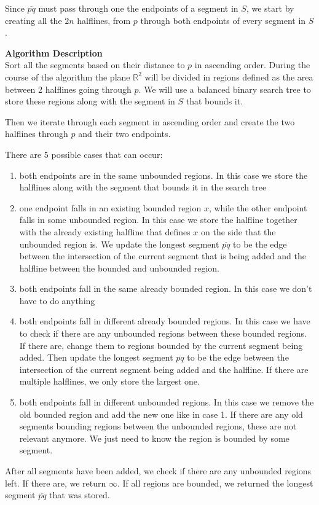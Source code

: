 \documentclass{article}
\begin{document}
\begin{enumerate}
    Since $\overline{pq}$ must pass through one the endpoints of a segment in $S$, we start by creating all the $2n$ halflines, from $p$ through both endpoints of every segment in $S$.

    \textbf{Algorithm Description} \\
    Sort all the segments based on their distance to $p$ in ascending order.
    During the course of the algorithm the plane $\mathbb{R}^2$ will be divided in regions defined as the area between 2 halflines going through $p$.
    We will use a balanced binary search tree to store these regions along with the segment in $S$ that bounds it.

    Then we iterate through each segment in ascending order and create the two halflines through $p$ and their two endpoints.

    There are 5 possible cases that can occur:
    \begin{enumerate}
      \item both endpoints are in the same unbounded regions. In this case we store the halflines along with the segment that bounds it in the search tree
      \item one endpoint falls in an existing bounded region $x$, while the other endpoint falls in some unbounded region.
       In this case we store the halfline together with the already existing halfline that defines $x$ on the side that the unbounded region is.
      We update the longest segment $\overline{pq}$ to be the edge between the intersection of the current segment that is being added and the halfline between the bounded and unbounded region.
      \item both endpoints fall in the same already bounded region. In this case we don't have to do anything
      \item both endpoints fall in different already bounded regions. In this case we have to check if there are any unbounded regions between these bounded regions.
      If there are, change them to regions bounded by the current segment being added. Then update the longest segment $\overline{pq}$ to be the edge between the intersection of the current segment being added and the halfline. 
      If there are multiple halflines, we only store the largest one.
      \item both endpoints fall in different unbounded regions. In this case we remove the old bounded region and add the new one like in case 1. 
      If there are any old segments bounding regions between the unbounded regions, these are not relevant anymore. We just need to know the region is bounded by some segment.
    \end{enumerate}
    After all segments have been added, we check if there are any unbounded regions left. If there are, we return $\infty$. 
    If all regions are bounded, we returned the longest segment $\overline{pq}$ that was stored.


\end{enumerate}
\end{document}
